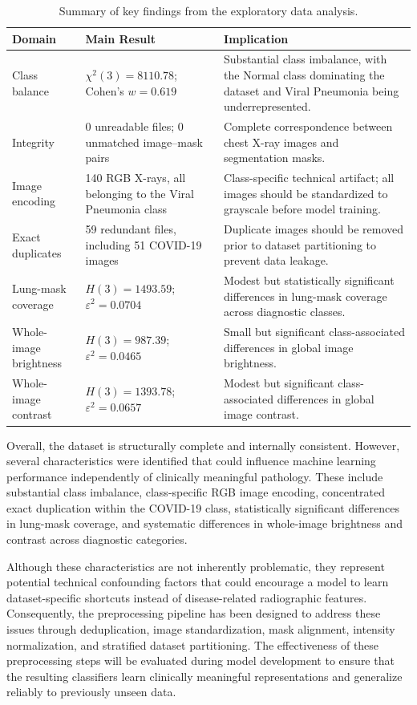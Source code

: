 \begin{table}[H]
\centering
\caption{Summary of key findings from the exploratory data analysis.}
\label{tab:summary_evidence}
\begin{tabular}{p{3cm} p{4.5cm} p{6cm}}
\toprule
\textbf{Domain} & \textbf{Main Result} & \textbf{Implication} \\
\midrule
Class balance &
$\chi^2(3)=8110.78$; Cohen's $w=0.619$ &
Substantial class imbalance, with the Normal class dominating the dataset and Viral Pneumonia being underrepresented. \\

Integrity &
0 unreadable files; 0 unmatched image--mask pairs &
Complete correspondence between chest X-ray images and segmentation masks. \\

Image encoding &
140 RGB X-rays, all belonging to the Viral Pneumonia class &
Class-specific technical artifact; all images should be standardized to grayscale before model training. \\

Exact duplicates &
59 redundant files, including 51 COVID-19 images &
Duplicate images should be removed prior to dataset partitioning to prevent data leakage. \\

Lung-mask coverage &
$H(3)=1493.59$; $\varepsilon^2=0.0704$ &
Modest but statistically significant differences in lung-mask coverage across diagnostic classes. \\

Whole-image brightness &
$H(3)=987.39$; $\varepsilon^2=0.0465$ &
Small but significant class-associated differences in global image brightness. \\

Whole-image contrast &
$H(3)=1393.78$; $\varepsilon^2=0.0657$ &
Modest but significant class-associated differences in global image contrast. \\
\bottomrule
\end{tabular}
\end{table}

Overall, the dataset is structurally complete and internally consistent.
However, several characteristics were identified that could influence machine
learning performance independently of clinically meaningful pathology. These
include substantial class imbalance, class-specific RGB image encoding,
concentrated exact duplication within the COVID-19 class, statistically
significant differences in lung-mask coverage, and systematic differences in
whole-image brightness and contrast across diagnostic categories.

Although these characteristics are not inherently problematic, they represent
potential technical confounding factors that could encourage a model to learn
dataset-specific shortcuts instead of disease-related radiographic features.
Consequently, the preprocessing pipeline has been designed to address these
issues through deduplication, image standardization, mask alignment, intensity
normalization, and stratified dataset partitioning. The effectiveness of these
preprocessing steps will be evaluated during model development to ensure that
the resulting classifiers learn clinically meaningful representations and
generalize reliably to previously unseen data.